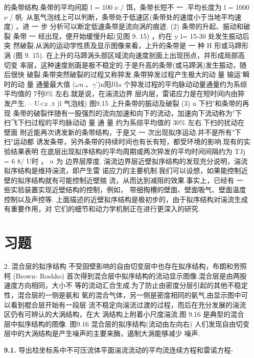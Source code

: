 的条带结构.条带的平均间距 l = 100 $\nu$ / 饵，条带长短不 一 .平均长度为 l = 1000$\nu$ / 帆$\cdot $ 从氢气泡线上可以判断，条带处于低速区(条带处的速度小于当地平均速度) ，进 一 步 分析可以断定低速条带是流向涡的痕迹. (2) 条带的升起、振动和破裂 条带 一 经出现，便开始缓慢升起(见图 9. 15) ，约在 y l= 15-30 处发生振动后突 然破裂.从涡的运动学性质及显示图像来看，上升的条带是 一 种 H 形或马蹄形涡 (图 9. 15). 在上升的马蹄涡头部区域流向速度剖面上出现拐点，并形成局部高切变 率层，这种速度剖面是极不稳定的.于是升高的条带(或马蹄涡)发生振动，随后很快 破裂.条带突然破裂的过程又称猝发.条带猝发过程产生极大的动 量 输运'瞬时的动 量 通量最大值 ($\omega$u 、$\gamma$')n阳川a 个猝发过程的平均脉动动量通量约为系综平均值的 7刊0\% 左右.就是说，在湍流边界 层内层，雷诺应力是在短时间内由猝发产生. -- U<z .t )l 气泡线) 图9.15 上升条带的振动及破裂 (3) u 下扫"和条带的再现 条带的破裂伴随有一股强烈的流向加速和向下的流动，加速向下流动称为"下 扫飞下扫过程的平均脉动动 量 通 量 约为系综平均值的 30\% 左右.下扫的扰动在壁面 附近能再次诱发新的条带结构，于是又 一 次出现拟序运动.并不是所有"下扫"运动都 诱发条带，另外条带的持续时间也有长有短，都受环境的影响.现有的实验结果表明 在底层出现拟序结构的平均周期或两次猝发的平均时间间隔约为 TJj = 6 8/ U时 ， ${\rm o}$ 为 边界层厚度. 湍流边界层近壁拟序结构的发现充分说明，湍流拟序结构是维持湍流，即产生雷 诺应力的主要机制.我们可以设想，如果能控制近壁的拟序结构就有可能控制近壁揣 流，从而达到减阻的效果.事实上，已经有 一 些实验装置实现近壁结构的控制，例如， 带细掏槽的壁面、壁面吸气、壁面温度控制以及声控等. 上面描述的近壁拟序结构是极初步的，由于拟序结构对湍流生成有重要作用，对 它们的细节和动力学机制正在进行更深入的研究.

\section*{习题}

2. 混合层的拟序结构 不受固壁影响的自由切变层中也存在拟序结构，布朗和劳照柯 (Brown- Roshko) 首次得到混合层中拟序结构的流动显示图像.混合层是由两股速度方向相同，大小不 等的流动汇合生成.为了防止由密度分层引起的其他不稳定性，混合层的一侧是氨和 氧的混合气体，另一侧是密度相同的氨气.由显示图中可以看到棍合层开始有一段层 流不稳定向湍流过渡的过程，而后在充分发展的湍流区仍有可辨认的大涡结构，在大 涡结构上附着小尺度湍流.图 9.16 是典型的混合层中拟序结构的图像. 图9.16 混合层的拟序结构(流动由左向右) 人们发现自由切变层中的大涡结构是产生噪声的主要来酶，遏制大涡能够减少 噪声.

\noindent\textbf{9.1.} 导出柱坐标系中不可压流体平面湍流流动的平均流连续方程和雷诺方程-


